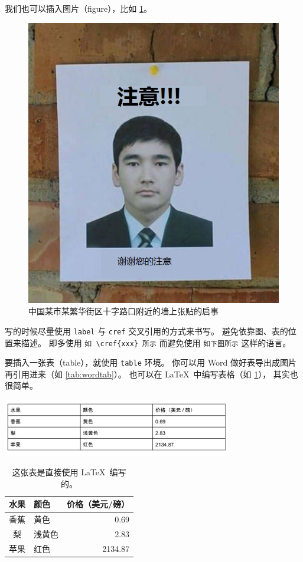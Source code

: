 \documentclass{article}
\newcommand*\botrule{\bottomrule}
\def\code{\lstinline}
\begin{document}
我们也可以插入图片（figure），比如 \cref{fig:attention}。
\begin{figure}[htpb]
    \centering
    \includegraphics[width=0.8\linewidth]{pics/thanks-for-your-attention.png}
    \caption{中国某市某繁华街区十字路口附近的墙上张贴的启事}
    \label{fig:attention}
\end{figure}
写的时候尽量使用 \code`label` 与 \code`cref` 交叉引用的方式来书写。
避免依靠图、表的位置来描述。
即多使用 \code`如 \cref{xxx} 所示` 
而避免使用 \code`如下图所示` 
这样的语言。

要插入一张表（table），就使用 \code`table` 环境。
你可以用 Word 做好表导出成图片再引用进来（如 \cref{tab:wordtab}）。
也可以在 \LaTeX\ 中编写表格（如 \cref{tab:latextab}），
其实也很简单。

\begin{table}[htpb]
    \centering
    \caption{%
        这张表是用 Google Doc 制作、再作为图片的形式导入进来的。
    }
    \label{tab:wordtab}
    \includegraphics[width=10cm]{pics/fruit-specs.png}
\end{table}

\begin{table}[htpb]
    \centering
    \caption{%
        这张表是直接使用 \LaTeX\ 编写的。
    }
    \label{tab:latextab}
    \begin{tabular}{clr} %
        \toprule
        水果 & 颜色   & 价格（美元/磅） \\
        \midrule
        香蕉 & 黄色   & 0.69            \\
        梨   & 浅黄色 & 2.83            \\
        苹果 & 红色   & 2134.87         \\
        \botrule
    \end{tabular}
\end{table}
\end{document}
